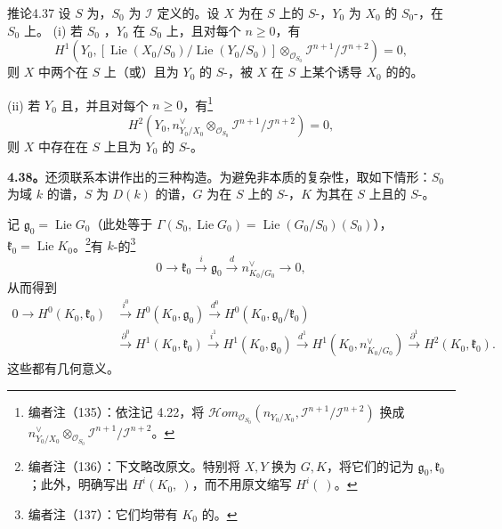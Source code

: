 \begin{SGAresult}{推论}{4.37}
设 $S$ 为，$S_0$ 为 $\mathscr I$ 定义的。设 $X$ 为在 $S$ 上的 $S$-，$Y_0$ 为 $X_0$ 的 $S_0$-，在 $S_0$ 上。
(i) 若 $S_0$ ，$Y_0$ 在 $S_0$ 上，且对每个 $n\geq0$，有
\[H^1(Y_0,[\operatorname{Lie}(X_0/S_0)/\operatorname{Lie}(Y_0/S_0)]\otimes_{\mathscr O_{S_0}}\mathscr I^{n+1}/\mathscr I^{n+2})=0,\]
则 $X$ 中两个在 $S$ 上（或）且为 $Y_0$ 的 $S$-，被 $X$ 在 $S$ 上某个诱导 $X_0$ 的的。

(ii) 若 $Y_0$ 且，并且对每个 $n\geq0$，有\footnote{编者注（135）：依注记 4.22，将 $\mathscr Hom_{\mathscr O_{S_0}}(n_{Y_0/X_0},\mathscr I^{n+1}/\mathscr I^{n+2})$ 换成 $n_{Y_0/X_0}^\vee\otimes_{\mathscr O_{S_0}}\mathscr I^{n+1}/\mathscr I^{n+2}$。}
\[H^2(Y_0,n_{Y_0/X_0}^\vee\otimes_{\mathscr O_{S_0}}\mathscr I^{n+1}/\mathscr I^{n+2})=0,\]
则 $X$ 中存在在 $S$ 上且为 $Y_0$ 的 $S$-。
\end{SGAresult}
\textbf{4.38。}还须联系本讲作出的三种构造。为避免非本质的复杂性，取如下情形：$S_0$ 为域 $k$ 的谱，$S$ 为 $D(k)$ 的谱，$G$ 为在 $S$ 上的 $S$-，$K$ 为其在 $S$ 上且的 $S$-。

记 $\mathfrak g_0=\operatorname{Lie}G_0$（此处等于 $\Gamma(S_0,\operatorname{Lie}G_0)=\operatorname{Lie}(G_0/S_0)(S_0)$），$\mathfrak k_0=\operatorname{Lie}K_0$。\footnote{编者注（136）：下文略改原文。特别将 $X,Y$ 换为 $G,K$，将它们的记为 $\mathfrak g_0,\mathfrak k_0$；此外，明确写出 $H^i(K_0,\ )$，而不用原文缩写 $H^i(\ )$。}有 $k$-的\footnote{编者注（137）：它们均带有 $K_0$ 的。}
\[0\longrightarrow\mathfrak k_0\xrightarrow i\mathfrak g_0\xrightarrow d n_{K_0/G_0}^\vee\longrightarrow0,\]
从而得到
\[
\begin{aligned}
0\longrightarrow H^0(K_0,\mathfrak k_0)&\xrightarrow{i^0}H^0(K_0,\mathfrak g_0)\xrightarrow{d^0}H^0(K_0,\mathfrak g_0/\mathfrak k_0)\\
&\xrightarrow{\partial^0}H^1(K_0,\mathfrak k_0)\xrightarrow{i^1}H^1(K_0,\mathfrak g_0)\xrightarrow{d^1}H^1(K_0,n_{K_0/G_0}^\vee)\xrightarrow{\partial^1}H^2(K_0,\mathfrak k_0).
\end{aligned}
\]
这些都有几何意义。


